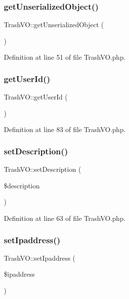 \subsubsection{\texorpdfstring{get\+Unserialized\+Object()}{getUnserializedObject()}}
{\footnotesize\ttfamily Trash\+V\+O\+::get\+Unserialized\+Object (\begin{DoxyParamCaption}{ }\end{DoxyParamCaption})}



Definition at line 51 of file Trash\+V\+O.\+php.

\hypertarget{classTrashVO_a2e999529c316982b83362d5e3af98675}{}\label{classTrashVO_a2e999529c316982b83362d5e3af98675} 
\subsubsection{\texorpdfstring{get\+User\+Id()}{getUserId()}}
{\footnotesize\ttfamily Trash\+V\+O\+::get\+User\+Id (\begin{DoxyParamCaption}{ }\end{DoxyParamCaption})}



Definition at line 83 of file Trash\+V\+O.\+php.

\hypertarget{classTrashVO_a4a906fbc1092ca145e78355deb731c8e}{}\label{classTrashVO_a4a906fbc1092ca145e78355deb731c8e} 
\subsubsection{\texorpdfstring{set\+Description()}{setDescription()}}
{\footnotesize\ttfamily Trash\+V\+O\+::set\+Description (\begin{DoxyParamCaption}\item[{}]{\$description }\end{DoxyParamCaption})}



Definition at line 63 of file Trash\+V\+O.\+php.

\hypertarget{classTrashVO_ae5493240d6a9fc0615bec61fd1aed5a6}{}\label{classTrashVO_ae5493240d6a9fc0615bec61fd1aed5a6} 
\subsubsection{\texorpdfstring{set\+Ipaddress()}{setIpaddress()}}
{\footnotesize\ttfamily Trash\+V\+O\+::set\+Ipaddress (\begin{DoxyParamCaption}\item[{}]{\$ipaddress }\end{DoxyParamCaption})}



